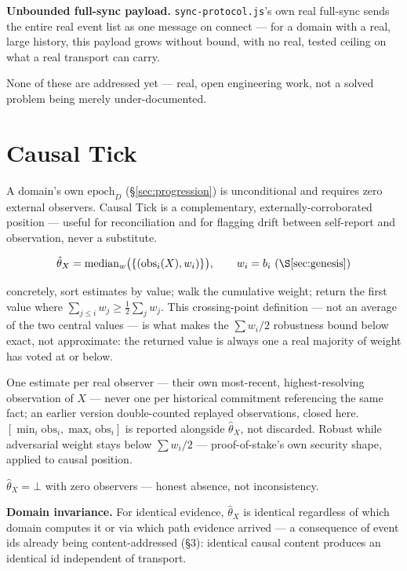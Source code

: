 \documentclass[10pt]{article}
\newcommand{\code}[1]{\texttt{\small #1}}
\begin{document}
\textbf{Unbounded full-sync payload.} \code{sync-protocol.js}'s own real full-sync sends the entire real event list as one message on connect --- for a domain with a real, large history, this payload grows without bound, with no real, tested ceiling on what a real transport can carry.

None of these are addressed yet --- real, open engineering work, not a solved problem being merely under-documented.

\section{Causal Tick}
\label{sec:tick}

A domain's own $\mathrm{epoch}_D$ (\S\ref{sec:progression}) is unconditional and requires zero external observers. Causal Tick is a complementary, externally-corroborated position --- useful for reconciliation and for flagging drift between self-report and observation, never a substitute.

\[
\hat{\theta}_X = \mathrm{median}_w\big(\{(\mathrm{obs}_i(X), w_i)\}\big), \qquad w_i = b_i \ (\S\ref{sec:genesis})
\]

concretely, sort estimates by value; walk the cumulative weight; return the first value where $\sum_{j \leq i} w_j \geq \frac{1}{2}\sum_j w_j$. This crossing-point definition --- not an average of the two central values --- is what makes the $\sum w_i/2$ robustness bound below exact, not approximate: the returned value is always one a real majority of weight has voted at or below.

One estimate per real observer --- their own most-recent, highest-resolving observation of $X$ --- never one per historical commitment referencing the same fact; an earlier version double-counted replayed observations, closed here. $[\min_i \mathrm{obs}_i, \max_i \mathrm{obs}_i]$ is reported alongside $\hat\theta_X$, not discarded. Robust while adversarial weight stays below $\sum w_i / 2$ --- proof-of-stake's own security shape, applied to causal position.

$\hat\theta_X = \bot$ with zero observers --- honest absence, not inconsistency.

\textbf{Domain invariance.} For identical evidence, $\hat\theta_X$ is identical regardless of which domain computes it or via which path evidence arrived --- a consequence of event ids already being content-addressed (\S3): identical causal content produces an identical id independent of transport.
\end{document}
